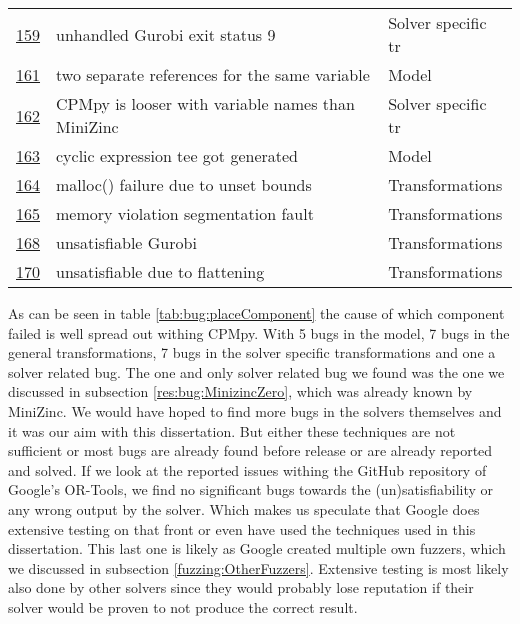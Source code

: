 \begin{table}[]
\begin{tabular}{lll}
		\href{https://github.com/CPMpy/cpmpy/issues/159}{159} & unhandled Gurobi exit status 9                    & Solver specific tr \\
		\href{https://github.com/CPMpy/cpmpy/issues/161}{161} & two separate references for the same variable     & Model              \\
		\href{https://github.com/CPMpy/cpmpy/issues/162}{162} & CPMpy is looser with variable names than MiniZinc & Solver specific tr \\
		\href{https://github.com/CPMpy/cpmpy/issues/163}{163} & cyclic expression tee got generated               & Model              \\
		\href{https://github.com/CPMpy/cpmpy/issues/164}{164} & malloc() failure due to unset bounds              & Transformations     \\
		\href{https://github.com/CPMpy/cpmpy/issues/165}{165} & memory violation segmentation fault               & Transformations     \\
		\href{https://github.com/CPMpy/cpmpy/issues/168}{168} & unsatisfiable Gurobi                              & Transformations     \\
		\href{https://github.com/CPMpy/cpmpy/issues/170}{170} & unsatisfiable due to flattening                   & Transformations     \\ \bottomrule        
	\end{tabular}
\end{table}

As can be seen in table \ref{tab:bug:placeComponent} the cause of which component failed is well spread out withing CPMpy. 
With 5 bugs in the model, 7 bugs in the general transformations, 7 bugs in the solver specific transformations and one a solver related bug. The one and only solver related bug we found was the one we discussed in subsection \ref{res:bug:MinizincZero}, which was already known by MiniZinc. We would have hoped to find more bugs in the solvers themselves and it was our aim with this dissertation. But either these techniques are not sufficient or most bugs are already found before release or are already reported and solved.
If we look at the reported issues withing the GitHub repository of Google's OR-Tools, we find no significant bugs towards the (un)satisfiability or any wrong output by the solver. Which makes us speculate that Google does extensive testing on that front or even have used the techniques used in this dissertation. This last one is likely as Google created multiple own fuzzers, which we discussed in subsection  \ref{fuzzing:OtherFuzzers}. Extensive testing is most likely also done by other solvers since they would probably lose reputation if their solver would be proven to not produce the correct result.

